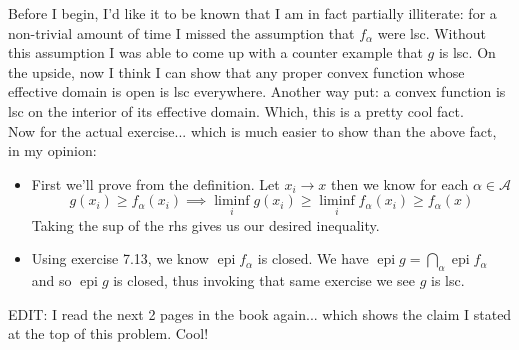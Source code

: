 \documentclass{article}
\newenvironment{ex}[1]
  {\renewcommand\theexercise{#1}\exercise}
  {\endexercise}
\DeclareMathOperator*{\epi}{epi}
\begin{document}
\begin{ex}{7.15} %
  Before I begin, I'd like it to be known that I am in fact partially illiterate: for a non-trivial amount of time I missed the assumption that $f_\alpha$ were lsc. Without this assumption I was able to come up with a counter example that $g$ is lsc. On the upside, now I think I can show that any proper convex function whose effective domain is open is lsc everywhere. Another way put: a convex function is lsc on the interior of its effective domain. Which, this is a pretty cool fact. \, \\

  Now for the actual exercise... which is much easier to show than the above fact, in my opinion:
  \begin{itemize}
    \item
      First we'll prove from the definition. Let $x_i \to x$ then we know for each $\alpha \in \mathcal{A}$
      $$
      g(x_i) \ge f_\alpha(x_i) \implies \liminf_i g(x_i) \ge \liminf_i f_\alpha(x_i) \ge f_\alpha(x)
      $$
      Taking the sup of the rhs gives us our desired inequality.
    \item
      Using exercise 7.13, we know $\epi f_\alpha$ is closed. We have $\epi g = \bigcap_\alpha \epi f_\alpha$ and so $\epi g$ is closed, thus invoking that same exercise we see $g$ is lsc.
  \end{itemize}

  EDIT: I read the next 2 pages in the book again... which shows the claim I stated at the top of this problem. Cool!
\end{ex} %
\end{document}

